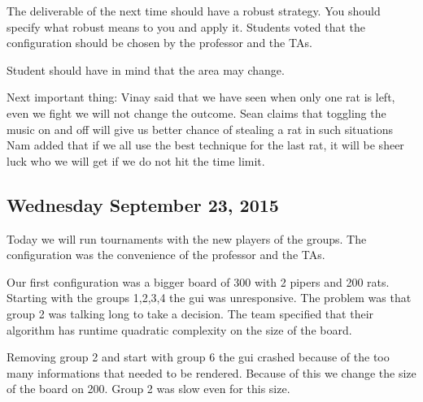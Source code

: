 The deliverable of the next time should have a robust strategy. You should specify what robust means to you and apply it.
Students voted that the configuration should be chosen by the professor and the TAs.

Student should have in mind that the area may change.

Next important thing:
Vinay said that we have seen when only one rat is left, even we fight we will not change the outcome.
Sean claims that toggling the music on and off will give us better chance of stealing a rat in such situations
Nam added that if we all use the best technique for the last rat, it will be sheer luck who we will get if we do not hit the time limit.

\subsection{Wednesday September 23, 2015}
Today we will run tournaments with the new players of the groups.
The configuration was the convenience of the professor and the TAs.

Our first configuration was a bigger board of 300 with 2 pipers and 200 rats.
Starting with the groups 1,2,3,4 the gui was unresponsive. The problem was that group 2 was talking long to take a decision. The team specified that their algorithm has runtime quadratic complexity on the size of the board.

Removing group 2 and start with group 6 the gui crashed because of the too many informations that needed to be rendered. Because of this we change the size of the board on 200. Group 2 was slow even for this size.

